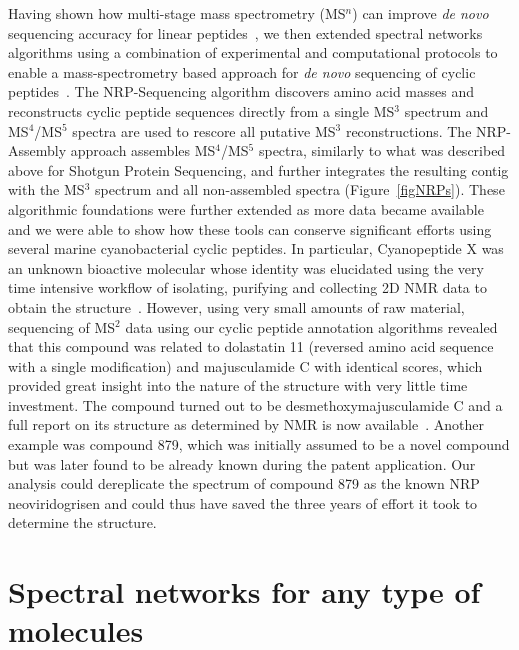 \documentclass[8.5pt,twoside,twocolumn]{article}
\begin{document}
Having shown how multi-stage mass spectrometry (MS$^n$) can improve {\em de novo} sequencing accuracy for linear peptides~\cite{bandeira08mann}, we then extended spectral networks algorithms using a combination of experimental and computational protocols to enable a mass-spectrometry based approach for {\em de novo} sequencing of cyclic peptides~\cite{bandeira08recomb}. The NRP-Sequencing algorithm discovers amino acid masses and reconstructs cyclic peptide sequences directly from a single MS$^3$ spectrum and MS$^4$/MS$^5$ spectra are used to rescore all putative MS$^3$ reconstructions. The NRP-Assembly approach assembles MS$^4$/MS$^5$ spectra, similarly to what was described above for Shotgun Protein Sequencing, and further integrates the resulting contig with the MS$^3$ spectrum and all non-assembled spectra (Figure~\ref{figNRPs}). These algorithmic foundations were further extended as more data became available~\cite{ng09} and we were able to show how these tools can conserve significant efforts using several marine cyanobacterial cyclic peptides. In particular, Cyanopeptide X was an unknown bioactive molecular whose identity was elucidated using the very time intensive workflow of isolating, purifying and collecting 2D NMR data to obtain the structure~\cite{liu09}. However, using very small amounts of raw material, sequencing of MS$^2$ data using our cyclic peptide annotation algorithms revealed that this compound was related to dolastatin 11 (reversed amino acid sequence with a single modification) and majusculamide C with identical scores, which provided great insight into the nature of the structure with very little time investment. The compound turned out to be desmethoxymajusculamide C and a full report on its structure as determined by NMR is now available~\cite{simmons09}. Another example was compound 879, which was initially assumed to be a novel compound but was later found to be already known during the patent application.  Our analysis could dereplicate the spectrum of compound 879 as the known NRP neoviridogrisen and could thus have saved the three years of effort it took to determine the structure.

\section{Spectral networks for any type of molecules}
\end{document}
